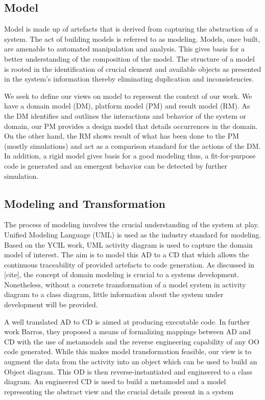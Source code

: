 \documentclass[10pt]{article}
\begin{document}
	\subsection{Model}
	Model is made up of artefacts that is derived from capturing the abstraction of a system. The act of building models is referred to as modeling. Models, once built, are amenable to automated manipulation and analysis. This gives basis for a better understanding of the composition of the model. The structure of a model is rooted in the identification of crucial element and available objects as presented in the system’s information thereby eliminating duplication and inconsistencies. 
	
We seek to define our views on model to represent the context of our work. We have a domain model (DM), platform model (PM) and result model (RM). As the DM identifies and outlines the interactions and behavior of the system or domain, our PM provides a design model that details occurrences in the domain. On the other hand, the RM shows result of what has been done to the PM (mostly simulations) and act as a comparison standard for the actions of the DM. In addition, a rigid model gives basis for a good modeling thus, a fit-for-purpose code is generated and an emergent behavior can be detected by further simulation.

\subsection{Modeling and Transformation}
The process of modeling involves the crucial understanding of the system at play. Unified Modeling Language (UML) is used as the industry standard for modeling. Based on the YCIL work, UML activity diagram is used to capture the domain model of interest. The aim is to model this AD to a CD that which allows the continuous traceability of provided artefacts to code generation. As discussed in [cite], the concept of domain modeling is crucial to a systems development. Nonetheless, without a concrete transformation of a model system in activity diagram to a class diagram, little information about the system under development will be provided.

A well translated AD to CD is aimed at producing executable code. In further work Barros, they proposed a means of formalizing mappings between AD and CD with the use of metamodels and the reverse engineering capability of any OO code generated.  While this makes model transformation feasible, our view is to augment the data from the activity into an object which can be used to build an Object diagram. This OD is then reverse-instantiated and engineered to a class diagram. An engineered CD is used to build a metamodel and a model representing the abstract view and the crucial details present in a system
\end{document}
